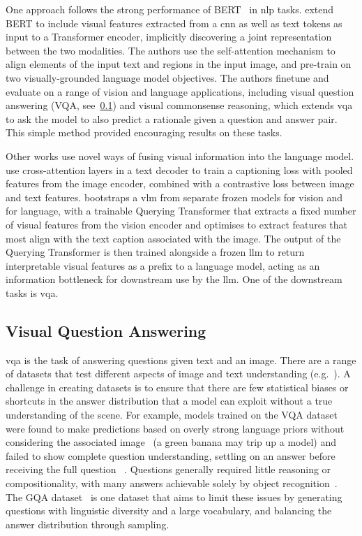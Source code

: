 One approach follows the strong performance of BERT~\cite{devlin2019bert} in
\acrshort{nlp} tasks. \citet{li2019visualbert} extend BERT to include visual
features extracted from a \acrshort{cnn} as well as text tokens as input to a
Transformer encoder, implicitly discovering a joint representation between the
two modalities. The authors use the self-attention mechanism to align elements
of the input text and regions in the input image, and pre-train on two
visually-grounded language model objectives. The authors finetune and evaluate
on a range of vision and language applications, including visual question
answering (VQA, see~\cref{ssec:vqa}) and visual commonsense reasoning, which
extends \acrshort{vqa} to ask the model to also predict a rationale given a
question and answer pair. This simple method provided encouraging results on
these tasks.

Other works use novel ways of fusing visual information into the language
model. \citet{yu2022coca} use cross-attention layers in a text decoder to train
a captioning loss with pooled features from the image encoder, combined with a
contrastive loss between image and text features. \citet{li2023blip2}
bootstraps a \acrshort{vlm} from separate frozen models for vision and for
language, with a trainable Querying Transformer that extracts a fixed number of
visual features from the vision encoder and optimises to extract features that
most align with the text caption associated with the image. The output of the
Querying Transformer is then trained alongside a frozen \acrshort{llm} to
return interpretable visual features as a prefix to a language model, acting as
an information bottleneck for downstream use by the \acrshort{llm}. One of the
downstream tasks is \acrlong{vqa}.

\subsection{Visual Question Answering}
\label{ssec:vqa}

\Acrfull{vqa} is the task of answering questions given text and an
image. There are a range of datasets that test different aspects of image and
text understanding (e.g.~\cite{johnson2017clevr,hudson2019gqa,antol2015vqa}). A
challenge in creating datasets is to ensure that there are few statistical
biases or shortcuts in the answer distribution that a model can exploit without
a true understanding of the scene. For example, models trained on the VQA
dataset~\citep{antol2015vqa} were found to make predictions based on overly
strong language priors without considering the associated
image~\citep{zhang2016yin} (a green banana may trip up a model) and failed to
show complete question understanding, settling on an answer before receiving
the full question ~\citep{agrawal2016analyzing}. Questions generally required
little reasoning or compositionality, with many answers achievable solely by
object recognition~\citep{hudson2019gqa}. The GQA dataset~\citep{hudson2019gqa}
is one dataset that aims to limit these issues by generating questions with
linguistic diversity and a large vocabulary, and balancing the answer
distribution through sampling. 

